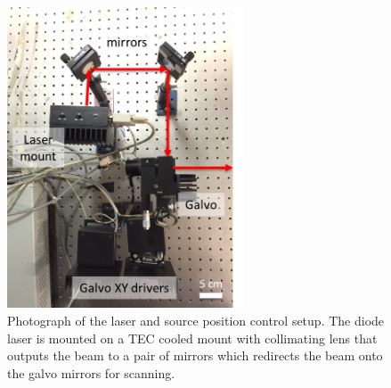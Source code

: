 \begin{figure}[h]
\centering\includegraphics[width=7cm]{./figures/3_Chestwall/FSsource.png}
\caption[Photograph of the freespace laser and source position control setup]{Photograph of the laser and source position control setup. The diode laser is mounted on a TEC cooled mount with collimating lens that outputs the beam to a pair of mirrors which redirects the beam onto the galvo mirrors for scanning.}
\label{fig:FSsource}
\end{figure}

